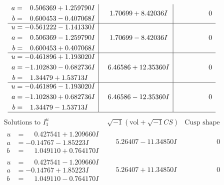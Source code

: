 \documentclass[1p]{elsarticle_modified}
\theoremstyle{definition}
\newcommand{\I}{\sqrt{-1}}
\begin{document}
$$\begin{array}{c|c|c}
\begin{aligned}
a &= \phantom{-}0.506369 + 1.259790 I \\
b &= \phantom{-}0.600453 - 0.407068 I\end{aligned}
 & \phantom{-}1.70699 + 8.42036 I & \phantom{-0.000000 } 0 \\ \hline\begin{aligned}
u &= -0.561222 - 1.141330 I \\
a &= \phantom{-}0.506369 - 1.259790 I \\
b &= \phantom{-}0.600453 + 0.407068 I\end{aligned}
 & \phantom{-}1.70699 - 8.42036 I & \phantom{-0.000000 } 0 \\ \hline\begin{aligned}
u &= -0.461896 + 1.193020 I \\
a &= -1.102830 - 0.682736 I \\
b &= \phantom{-}1.34479 + 1.53713 I\end{aligned}
 & \phantom{-}6.46586 + 12.35360 I & \phantom{-0.000000 } 0 \\ \hline\begin{aligned}
u &= -0.461896 - 1.193020 I \\
a &= -1.102830 + 0.682736 I \\
b &= \phantom{-}1.34479 - 1.53713 I\end{aligned}
 & \phantom{-}6.46586 - 12.35360 I & \phantom{-0.000000 } 0\\
 \hline 
 \end{array}$$\newpage$$\begin{array}{c|c|c}  
\text{Solutions to }I^u_{1}& \I (\text{vol} + \sqrt{-1}CS) & \text{Cusp shape}\\
 \hline 
\begin{aligned}
u &= \phantom{-}0.427541 + 1.209660 I \\
a &= -0.14767 - 1.85223 I \\
b &= \phantom{-}1.049110 + 0.764170 I\end{aligned}
 & \phantom{-}5.26407 - 11.34850 I & \phantom{-0.000000 } 0 \\ \hline\begin{aligned}
u &= \phantom{-}0.427541 - 1.209660 I \\
a &= -0.14767 + 1.85223 I \\
b &= \phantom{-}1.049110 - 0.764170 I\end{aligned}
 & \phantom{-}5.26407 + 11.34850 I & \phantom{-0.000000 } 0 \\ \hline\begin{aligned}

\end{aligned}
\end{array}$$
\end{document}
